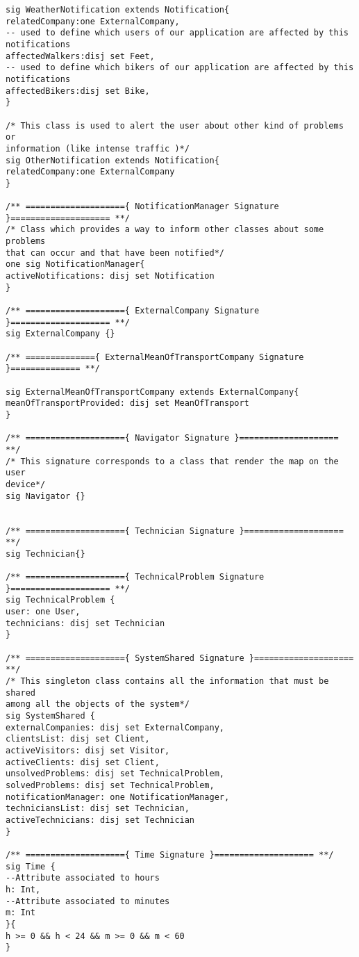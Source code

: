 \documentclass[a4paper,leqno]{book}
\begin{document}
\begin{lstlisting}
sig WeatherNotification extends Notification{
relatedCompany:one ExternalCompany,
-- used to define which users of our application are affected by this notifications
affectedWalkers:disj set Feet,
-- used to define which bikers of our application are affected by this
notifications
affectedBikers:disj set Bike,
}

/* This class is used to alert the user about other kind of problems or
information (like intense traffic )*/
sig OtherNotification extends Notification{
relatedCompany:one ExternalCompany
}

/** ===================={ NotificationManager Signature }==================== **/
/* Class which provides a way to inform other classes about some problems
that can occur and that have been notified*/
one sig NotificationManager{
activeNotifications: disj set Notification
}

/** ===================={ ExternalCompany Signature }==================== **/
sig ExternalCompany {}

/** =============={ ExternalMeanOfTransportCompany Signature }============== **/

sig ExternalMeanOfTransportCompany extends ExternalCompany{
meanOfTransportProvided: disj set MeanOfTransport
}

/** ===================={ Navigator Signature }==================== **/
/* This signature corresponds to a class that render the map on the user
device*/
sig Navigator {}


/** ===================={ Technician Signature }==================== **/
sig Technician{}

/** ===================={ TechnicalProblem Signature }==================== **/
sig TechnicalProblem {
user: one User,
technicians: disj set Technician
}

/** ===================={ SystemShared Signature }==================== **/
/* This singleton class contains all the information that must be shared
among all the objects of the system*/
sig SystemShared {
externalCompanies: disj set ExternalCompany,
clientsList: disj set Client,
activeVisitors: disj set Visitor,
activeClients: disj set Client,
unsolvedProblems: disj set TechnicalProblem,
solvedProblems: disj set TechnicalProblem,
notificationManager: one NotificationManager,
techniciansList: disj set Technician,
activeTechnicians: disj set Technician
}

/** ===================={ Time Signature }==================== **/
sig Time {
--Attribute associated to hours
h: Int,
--Attribute associated to minutes
m: Int
}{
h >= 0 && h < 24 && m >= 0 && m < 60
} 


\end{lstlisting}
\end{document}
